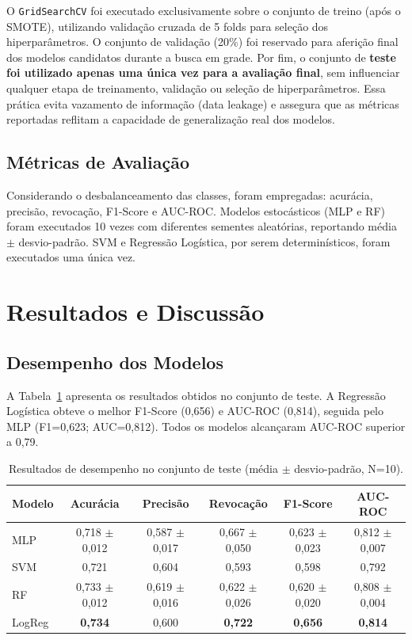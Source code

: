 \documentclass[conference]{IEEEtran}
\begin{document}
O \texttt{GridSearchCV} foi executado exclusivamente sobre o conjunto de treino (ap\'{o}s o SMOTE), utilizando valida\c{c}\~ao cruzada de 5 folds para sele\c{c}\~ao dos hiperpar\^{a}metros. O conjunto de valida\c{c}\~ao (20\%) foi reservado para aferi\c{c}\~ao final dos modelos candidatos durante a busca em grade. Por fim, o conjunto de \textbf{teste foi utilizado apenas uma \'{u}nica vez para a avalia\c{c}\~ao final}, sem influenciar qualquer etapa de treinamento, valida\c{c}\~ao ou sele\c{c}\~ao de hiperpar\^{a}metros. Essa pr\'{a}tica evita vazamento de informa\c{c}\~ao (data leakage) e assegura que as m\'{e}tricas reportadas reflitam a capacidade de generaliza\c{c}\~ao real dos modelos.

\subsection{M\'{e}tricas de Avalia\c{c}\~ao}

Considerando o desbalanceamento das classes, foram empregadas: acur\'{a}cia, precis\~ao, revoca\c{c}\~ao, F1-Score e AUC-ROC. Modelos estoc\'{a}sticos (MLP e RF) foram executados 10 vezes com diferentes sementes aleat\'{o}rias, reportando m\'{e}dia $\pm$ desvio-padr\~ao. SVM e Regress\~ao Log\'{i}stica, por serem determin\'{i}sticos, foram executados uma \'{u}nica vez.

\section{Resultados e Discuss\~ao}

\subsection{Desempenho dos Modelos}

A Tabela~\ref{tab:resultados} apresenta os resultados obtidos no conjunto de teste. A Regress\~ao Log\'{i}stica obteve o melhor F1-Score (0,656) e AUC-ROC (0,814), seguida pelo MLP (F1=0,623; AUC=0,812). Todos os modelos alcan\c{c}aram AUC-ROC superior a 0,79.

\begin{table}[H]
\caption{Resultados de desempenho no conjunto de teste (m\'{e}dia $\pm$ desvio-padr\~ao, N=10).}
\label{tab:resultados}
\centering
\scriptsize
\setlength{\tabcolsep}{1.5pt}
\begin{tabular}{@{}lccccc@{}}
\toprule
Modelo & Acur\'{a}cia & Precis\~ao & Revoca\c{c}\~ao & F1-Score & AUC-ROC \\
\midrule
MLP & 0,718 $\pm$ 0,012 & 0,587 $\pm$ 0,017 & 0,667 $\pm$ 0,050 & 0,623 $\pm$ 0,023 & 0,812 $\pm$ 0,007 \\
SVM & 0,721 & 0,604 & 0,593 & 0,598 & 0,792 \\
RF & 0,733 $\pm$ 0,012 & 0,619 $\pm$ 0,016 & 0,622 $\pm$ 0,026 & 0,620 $\pm$ 0,020 & 0,808 $\pm$ 0,004 \\
LogReg & \textbf{0,734} & 0,600 & \textbf{0,722} & \textbf{0,656} & \textbf{0,814} \\
\bottomrule
\end{tabular}
\end{table}
\end{document}
